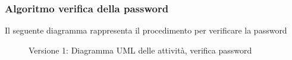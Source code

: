 \subsubsection{Algoritmo verifica della password}
Il seguente diagramma rappresenta il procedimento per verificare la password
\vspace{0.5cm}
\begin{figure}[H]
    \centering
    \caption{Versione 1: Diagramma UML delle attività, verifica password}
    \label{fig:activity_user_password}
\end{figure}